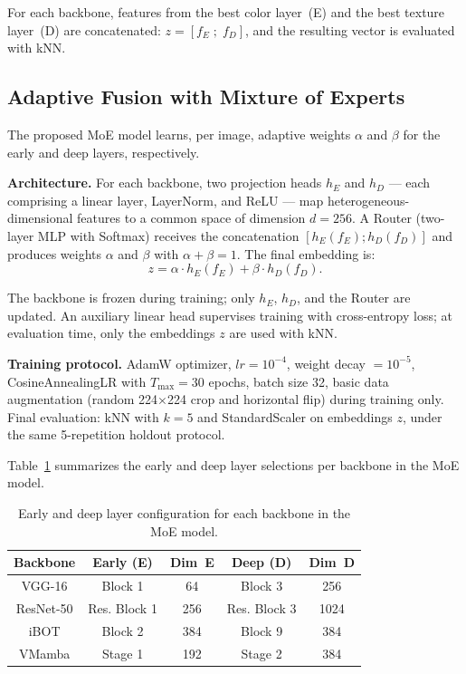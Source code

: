 \documentclass[conference]{IEEEtran}
\begin{document}
For each backbone, features from the best color layer~(E) and the best
texture layer~(D) are concatenated: $z = [f_E \; ; \; f_D]$, and the
resulting vector is evaluated with kNN.

\subsection{Adaptive Fusion with Mixture of Experts}

The proposed MoE model learns, per image, adaptive weights $\alpha$ and
$\beta$ for the early and deep layers, respectively.

\textbf{Architecture.} For each backbone, two projection heads $h_E$ and
$h_D$ — each comprising a linear layer, LayerNorm, and ReLU — map
heterogeneous-dimensional features to a common space of dimension $d=256$.
A Router (two-layer MLP with Softmax) receives the concatenation
$[h_E(f_E) ; h_D(f_D)]$ and produces weights $\alpha$ and $\beta$ with
$\alpha + \beta = 1$.
The final embedding is:
\begin{equation}
    z = \alpha \cdot h_E(f_E) + \beta \cdot h_D(f_D).
    \label{eq:moe}
\end{equation}

The backbone is frozen during training; only $h_E$, $h_D$, and the Router
are updated.
An auxiliary linear head supervises training with cross-entropy loss; at
evaluation time, only the embeddings $z$ are used with kNN.

\textbf{Training protocol.}
AdamW optimizer, $lr = 10^{-4}$, weight decay $= 10^{-5}$,
CosineAnnealingLR with $T_{\max} = 30$ epochs, batch size 32, basic data
augmentation (random 224$\times$224 crop and horizontal flip) during
training only.
Final evaluation: kNN with $k=5$ and StandardScaler on embeddings $z$,
under the same 5-repetition holdout protocol.

Table~\ref{tab_moe_config} summarizes the early and deep layer selections
per backbone in the MoE model.

\begin{table}[htbp]
\caption{Early and deep layer configuration for each backbone in the MoE
         model.}
\begin{center}
\begin{tabular}{c|c|c|c|c}
\hline
\textbf{Backbone} & \textbf{Early (E)} & \textbf{Dim~E}
                  & \textbf{Deep (D)} & \textbf{Dim~D} \\
\hline
VGG-16    & Block 1     & 64   & Block 3     & 256  \\
ResNet-50 & Res. Block 1 & 256  & Res. Block 3 & 1024 \\
iBOT      & Block 2     & 384  & Block 9     & 384  \\
VMamba    & Stage 1     & 192  & Stage 2     & 384  \\
\hline
\end{tabular}
\label{tab_moe_config}
\end{center}
\end{table}
\end{document}

